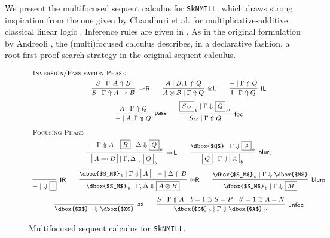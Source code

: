 \documentclass[runningheads]{llncs}
\newcommand{\tl}{\otimes \mathsf{L}}
\newcommand{\tr}{\otimes \mathsf{R}}
\newcommand{\lright}{{\multimap}\mathsf{R}}
\newcommand{\lleft}{{\multimap}\mathsf{L}}
\newcommand{\pass}{\mathsf{pass}}
\newcommand{\unitl}{\mathsf{IL}}
\newcommand{\unitr}{\mathsf{IR}}
\newcommand{\otL}{\tl}
\newcommand{\otR}{\tr}
\newcommand{\lolliR}{\lright}
\newcommand{\lolliL}{\lleft}
\newcommand{\IL}{\unitl}
\newcommand{\IR}{\unitr}
\newcommand{\ax}{\mathsf{ax}}
\newcommand{\ot}{\otimes}
\newcommand{\lolli}{\multimap}
\newcommand{\I}{\mathsf{I}}
\newcommand{\SkNMILL}{\texttt{SkNMILL}}
\newcommand{\up}{\Uparrow}
\newcommand{\dn}{\Downarrow}
\newcommand{\foc}{\mathsf{foc}}
\newcommand{\blurL}{\mathsf{blur_L}}
\newcommand{\blurR}{\mathsf{blur_R}}
\newcommand{\unfoc}{\mathsf{unfoc}}
\begin{document}
We present the multifocused sequent calculus for \SkNMILL, which draws strong inspiration from   the one given by Chaudhuri et al. for multiplicative-additive classical linear logic \cite{chaudhuri:canonical:2008}. Inference rules are given in . As in the original formulation by Andreoli \cite{andreoli:logic:1992}, the (multi)focused calculus describes, in a declarative fashion, a root-first proof search strategy in the original sequent calculus.
\begin{figure}[t]
  \[
  \small
  \begin{array}{c}
    \multicolumn{1}{l}{\text{\textsc{Inversion/Passivation Phase}}} \\[4pt]
      \infer[\lolliR]{S \mid \Gamma \up A \lolli B}{S \mid \Gamma , A \up B}
    \qquad
    \infer[\otL]{A \ot B \mid \Gamma \up Q}{A \mid  B , \Gamma \up Q}
    \qquad
      \infer[\IL]{\I \mid \Gamma \up Q}{- \mid \Gamma \up Q}    
    \\[6pt]    
    \infer[\pass]{- \mid A , \Gamma \up Q}{
      A\mid \Gamma \up Q
    }
    \qquad
        \infer[\foc]{S_M \mid \Gamma \up Q}{
      \fbox{$S_M$}_{\, b} \mid \Gamma \dn \fbox{$Q$}_{\, b'}
    }
    \\[9pt]
    \multicolumn{1}{l}{\text{\textsc{Focusing Phase}}} \\[4pt]
    \infer[\lolliL]{\fbox{$A \lolli B$} \mid \Gamma , \Delta \dn \fbox{$Q$}_{\,b}}{
      - \mid \Gamma \up A
      &
      \fbox{$B$} \mid \Delta \dn \fbox{$Q$}_{\,b}
    }
    \qquad
        \infer[\blurL]{\fbox{$Q$} \mid \Gamma \dn \fbox{$A$}_{\,b}}{
      \dbox{$Q$} \mid \Gamma \dn \fbox{$A$}_{\,b}
      }    
    \\[8pt]
    \infer[\IR]{- \mid ~ \dn \fbox{$\I$}}{}
    \qquad
    \infer[\otR]{\dbox{$S_M$}_{\,b} \mid \Gamma , \Delta \dn \fbox{$A \ot B$}}{
      \dbox{$S_M$}_{\,b} \mid \Gamma \dn \fbox{$A$}
      &
      - \mid \Delta \up B
    }
    \qquad
        \infer[\blurR]{\dbox{$S_M$}_{\,b} \mid \Gamma \dn \fbox{$M$}}{
      \dbox{$S_M$}_{\,b} \mid \Gamma \dn \dbox{$M$}
    }
    \\[8pt]
    \infer[\ax]{\dbox{$X$} \mid ~ \dn \dbox{$X$}}{}
    \qquad
    \infer[\unfoc]{\dbox{$S$}_{\,b} \mid \Gamma \dn \dbox{$A$}_{\,b'}}{
      S \mid \Gamma \up A
      &
      b = 1 \supset S = P
      &
      b' = 1 \supset A = N
    }
  \end{array}
  \]
  \caption{Multifocused sequent calculus for \SkNMILL.} 
  \label{fig:multifocus}
\end{figure}
\end{document}
